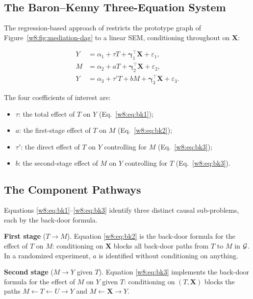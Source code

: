 \documentclass[master.tex]{subfiles}
\begin{document}
\subsection{The Baron--Kenny Three-Equation System}

The regression-based approach of \citet{baron1986moderator} restricts
the prototype graph of Figure~\ref{w8:fig:mediation-dag} to a linear
SEM, conditioning throughout on $\mathbf{X}$:

\begin{align}
  Y  &= \alpha_1 + \tau T + \boldsymbol{\gamma}_1^{\top}\mathbf{X}
        + \varepsilon_1,
  \label{w8:eq:bk1} \\[4pt]
  M  &= \alpha_2 + a T + \boldsymbol{\gamma}_2^{\top}\mathbf{X}
        + \varepsilon_2,
  \label{w8:eq:bk2} \\[4pt]
  Y  &= \alpha_3 + \tau' T + b M
        + \boldsymbol{\gamma}_3^{\top}\mathbf{X} + \varepsilon_3.
  \label{w8:eq:bk3}
\end{align}

The four coefficients of interest are:
\begin{itemize}
  \item $\tau$: the total effect of $T$ on $Y$ (Eq.~\eqref{w8:eq:bk1});
  \item $a$: the first-stage effect of $T$ on $M$ (Eq.~\eqref{w8:eq:bk2});
  \item $\tau'$: the direct effect of $T$ on $Y$ controlling for $M$
    (Eq.~\eqref{w8:eq:bk3});
  \item $b$: the second-stage effect of $M$ on $Y$ controlling for $T$
    (Eq.~\eqref{w8:eq:bk3}).
\end{itemize}

\subsection{The Component Pathways}

Equations \eqref{w8:eq:bk1}--\eqref{w8:eq:bk3} identify three
distinct causal sub-problems, each by the back-door formula.

\medskip\noindent\textbf{First stage} ($T \to M$).  Equation
\eqref{w8:eq:bk2} is the back-door formula for the effect of $T$ on
$M$: conditioning on $\mathbf{X}$ blocks all back-door paths from $T$
to $M$ in $\mathcal{G}$.  In a randomized experiment, $a$ is identified
without conditioning on anything.

\medskip\noindent\textbf{Second stage} ($M \to Y$ given $T$).
Equation \eqref{w8:eq:bk3} implements the back-door formula for the
effect of $M$ on $Y$ given $T$: conditioning on $(T, \mathbf{X})$
blocks the paths $M \leftarrow T \leftarrow U \to Y$ and
$M \leftarrow \mathbf{X} \to Y$.
\end{document}
